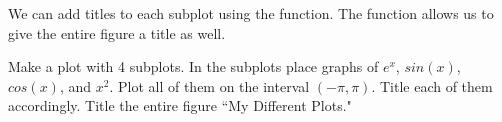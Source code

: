 We can add titles to each subplot using the  function. The
 function allows us to give the entire figure a title
as well.

\begin{problem} 
Make a plot with 4 subplots. In the subplots place graphs of $e^x$,
$sin(x)$, $cos(x)$, and $x^2$. Plot all of them on the interval
$(-\pi,\pi)$. Title each of them accordingly. Title the entire figure
``My Different Plots." 
\end{problem}

